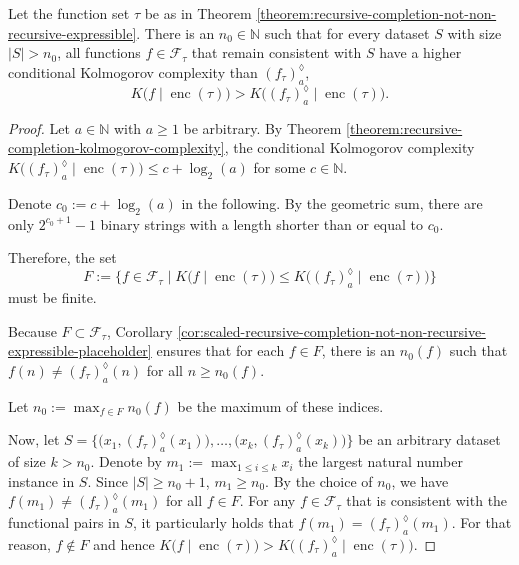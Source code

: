 \begin{theorem}
	\label{theorem:surpass-kolmogorov-complexity-threshold}
	
	Let the function set $\tau$ be as in Theorem \ref{theorem:recursive-completion-not-non-recursive-expressible}.
	There is an $n_0\in\mathbb{N}$ such that for every dataset $S$ with size $|S|> n_0$, all functions $f\in \mathcal{F}_{\tau}$ that remain consistent with $S$ have a higher conditional Kolmogorov complexity than $\left(f_{\tau}\right)_a^{\lozenge}$,
	\begin{equation}
		K\bigl(f\mid \operatorname{enc}(\tau)\bigr) > K\bigl(\left(f_{\tau}\right)_a^{\lozenge} \mid \operatorname{enc}(\tau)\bigr).
	\end{equation}
\end{theorem}
\begin{proof}
	Let $a\in\mathbb{N}$ with $a\geq 1$ be arbitrary.
	By Theorem \ref{theorem:recursive-completion-kolmogorov-complexity}, the conditional Kolmogorov complexity $K\bigl(\left(f_{\tau}\right)_a^{\lozenge} \mid \operatorname{enc}(\tau)\bigr)\leq c+\log_2(a)$ for some $c\in\mathbb{N}$.
	
	Denote $c_0:=c+\log_2(a)$ in the following.
	By the geometric sum, there are only $2^{c_0+1}-1$ binary strings with a length shorter than or equal to $c_0$.
	
	Therefore, the set 
	\begin{equation}
		F:=\bigl\{f\in \mathcal{F}_{\tau} \mid K\bigl(f\mid \operatorname{enc}(\tau)\bigr)\leq K\bigl(\left(f_{\tau}\right)_a^{\lozenge} \mid \operatorname{enc}(\tau)\bigr)\bigr\}	
	\end{equation}
	must be finite.
	
	Because $F\subset \mathcal{F}_{\tau}$, Corollary \ref{cor:scaled-recursive-completion-not-non-recursive-expressible-placeholder} ensures that for each $f\in F$, there is an $n_0(f)$ such that $f(n)\neq \left(f_{\tau}\right)_a^{\lozenge}(n)$ for all $n\geq n_0(f)$.
	
	Let $n_0:=\max_{f\in F}n_0(f)$ be the maximum of these indices.
	
	Now, let $S=\bigl\{\bigl(x_1,\left(f_{\tau}\right)_a^{\lozenge}(x_1)\bigr),\dots,\bigl(x_k,\left(f_{\tau}\right)_a^{\lozenge}(x_k)\bigr)\bigr\}$ be an arbitrary dataset of size $k > n_0$.
	Denote by $m_1:=\max_{1\leq i\leq k}x_i$ the largest natural number instance in $S$.
	Since $|S|\geq n_0+1$, $m_1\geq n_0$.
	By the choice of $n_0$, we have $f(m_1)\neq \left(f_{\tau}\right)_a^{\lozenge}(m_1)$ for all $f\in F$.
	For any $f\in\mathcal{F}_{\tau}$ that is consistent with the functional pairs in $S$, it particularly holds that $f(m_1)=\left(f_{\tau}\right)_a^{\lozenge}(m_1)$.
	For that reason, $f\notin F$ and hence $K\bigl(f\mid \operatorname{enc}(\tau)\bigr) > K\bigl(\left(f_{\tau}\right)_a^{\lozenge} \mid \operatorname{enc}(\tau)\bigr)$.
\end{proof}
